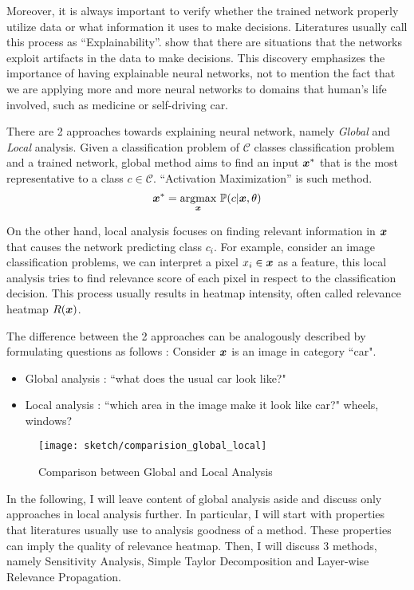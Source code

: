 Moreover, it is always important to verify whether the trained network properly utilize data or what information it uses to make decisions. Literatures usually call this process as ``Explainability''.  \cite{BachAnalyzingclassifiersFisher2016} show that there are situations that the networks exploit artifacts in the data to make decisions. This discovery emphasizes the importance of having explainable neural networks, not to mention the fact that we are applying more and more neural networks to domains that human's life involved, such as medicine or self-driving car.

There are 2 approaches towards explaining neural network, namely \textit{Global} and \textit{Local} analysis. Given a  classification problem of $\mathcal{C}$ classes classification problem and a trained network, global method aims to find an input $\patvector{x}^*$ that is the most representative to a class $c \in \mathcal{C}$. ``Activation Maximization\cite{ErhanUnderstandingRepresentationsLearned2010}'' is such method.
$$
\patvector{x}^*  = \patarg{max}{\patvector{x}}  \mathbb{P}( c |\patvector{x},\theta)
$$

On the other hand, local analysis focuses on finding relevant information in $\patvector{x}$ that causes the network predicting class $c_i$.  For example, consider an image classification problems, we can interpret a pixel $x_i \in \patvector{x}$ as a feature, this local analysis tries to find relevance score of each pixel in respect to the classification decision. This process usually results in heatmap intensity, often called relevance heatmap $R(\patvector{x})$.

The difference  between the 2 approaches can be analogously described by formulating questions as follows : Consider $\patvector{x}$ is an image in category ``car".
\begin{itemize}
	\item Global analysis : ``what does the usual car look like?"
    \item Local analysis : ``which area in the image make it look like car?" wheels, windows?
\end{itemize}

 \begin{figure}[!hbt]
\centering
\texttt{[image: sketch/comparision\_global\_local]}
\caption{Comparison between Global and Local Analysis}
\label{fig:comparision_between_global_and_local_analysis}
\end{figure}

In the following, I will leave content of global analysis aside and discuss  only approaches in local analysis further.  In particular, I will start with properties that literatures usually use to analysis goodness of a method. These properties can imply the quality of relevance heatmap. Then, I will discuss  3 methods, namely Sensitivity Analysis,  Simple Taylor Decomposition and Layer-wise Relevance Propagation.

